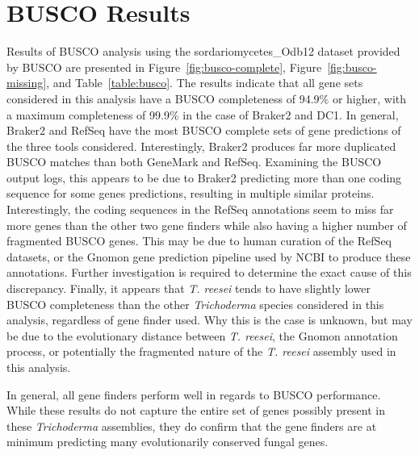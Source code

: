 \section{BUSCO Results}
\label{section:busco}

Results of BUSCO analysis using the sordariomycetes\_Odb12 dataset provided by BUSCO are presented in Figure~\ref{fig:busco-complete}, Figure~\ref{fig:busco-missing}, and Table~\ref{table:busco}. The results 
indicate that all gene sets considered in this analysis have a BUSCO
completeness of 94.9\% or higher, with a maximum completeness of
99.9\% in the case of Braker2 and DC1. In general, Braker2 and RefSeq have the
most BUSCO complete sets of gene predictions of the three tools
considered. Interestingly, Braker2 produces far more duplicated BUSCO
matches than both GeneMark and RefSeq. Examining the BUSCO output
logs, this appears to be due to Braker2 predicting more than one
coding sequence for some genes predictions, resulting in multiple
similar proteins. Interestingly, the coding sequences in the RefSeq annotations seem to miss far more genes than the other two gene finders while also having a higher number of fragmented BUSCO genes. This may be due to human curation of the RefSeq datasets, or the Gnomon gene prediction pipeline used by NCBI to produce these annotations. Further investigation is required to determine the exact cause of this discrepancy. Finally, it appears that \textit{T. reesei} tends to have slightly lower BUSCO completeness than the other \textit{Trichoderma} species considered in this analysis, regardless of gene finder used. Why this is the case is unknown, but may be due to the evolutionary distance between \textit{T. reesei}, the Gnomon annotation process, or potentially the fragmented nature of the \textit{T. reesei} assembly used in this analysis. 

In general, all gene finders perform
well in regards to BUSCO performance. While these results do not
capture the entire set of genes possibly present in these
\textit{Trichoderma} assemblies, they do confirm that the gene finders
are at minimum predicting many evolutionarily conserved fungal genes.

